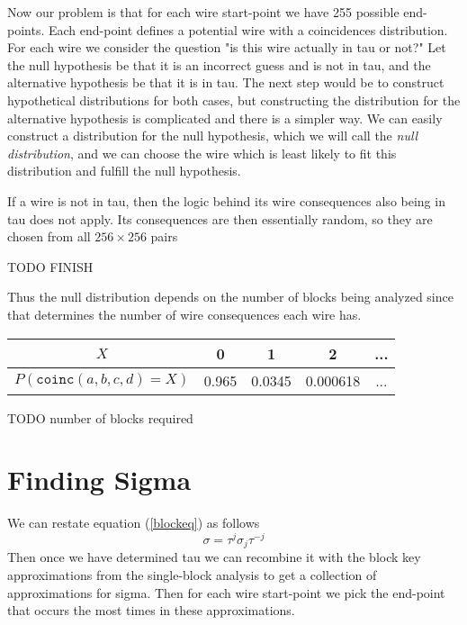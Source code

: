 \documentclass[12pt]{article}
\theoremstyle{definition}
\theoremstyle{remark}
\theoremstyle{remark}
\begin{document}
\par
Now our problem is that for each wire start-point we have 255 possible end-points. Each end-point defines a potential wire with a coincidences distribution. For each wire we consider the question "is this wire actually in tau or not?" Let the null hypothesis be that it is an incorrect guess and is not in tau, and the alternative hypothesis be that it is in tau. The next step would be to construct hypothetical distributions for both cases, but constructing the distribution for the alternative hypothesis is complicated and there is a simpler way. We can easily construct a distribution for the null hypothesis, which we will call the \emph{null distribution}, and we can choose the wire which is least likely to fit this distribution and fulfill the null hypothesis.

\par
If a wire is not in tau, then the logic behind its wire consequences also being in tau does not apply. Its consequences are then essentially random, so they are chosen from all $256\times 256$ pairs

TODO FINISH


Thus the null distribution depends on the number of blocks being analyzed since that determines the number of wire consequences each wire has.
\begin{center}
\begin{tabular}{|c|c|c|c|c|}
\hline
$X$ & 0 & 1 & 2 & ... \\
\hline 
$P(\texttt{coinc}(a,b,c,d)=X)$ & 0.965 & 0.0345 & 0.000618 & ... \\

\hline
\end{tabular}
\end{center}

\par

\par
TODO number of blocks required

\section{Finding Sigma}

\par
We can restate equation (\ref{blockeq}) as follows
\[ \sigma = \tau^j \sigma_j \tau^{-j} \]
Then once we have determined tau we can recombine it with the block key approximations from the single-block analysis to get a collection of approximations for sigma. Then for each wire start-point we pick the end-point that occurs the most times in these approximations.
\end{document}
